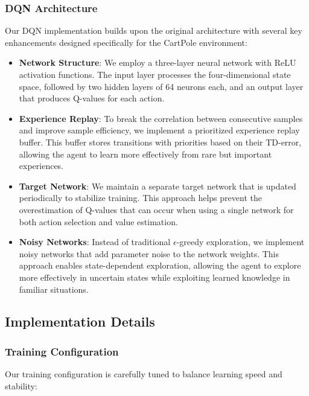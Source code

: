 \documentclass[conference]{IEEEtran}
\begin{document}
\subsubsection{DQN Architecture}
Our DQN implementation builds upon the original architecture with several key enhancements designed specifically for the CartPole environment:

\begin{itemize}
    \item \textbf{Network Structure}: We employ a three-layer neural network with ReLU activation functions. The input layer processes the four-dimensional state space, followed by two hidden layers of 64 neurons each, and an output layer that produces Q-values for each action.
    
    \item \textbf{Experience Replay}: To break the correlation between consecutive samples and improve sample efficiency, we implement a prioritized experience replay buffer. This buffer stores transitions with priorities based on their TD-error, allowing the agent to learn more effectively from rare but important experiences.
    
    \item \textbf{Target Network}: We maintain a separate target network that is updated periodically to stabilize training. This approach helps prevent the overestimation of Q-values that can occur when using a single network for both action selection and value estimation.
    
    \item \textbf{Noisy Networks}: Instead of traditional $\epsilon$-greedy exploration, we implement noisy networks that add parameter noise to the network weights. This approach enables state-dependent exploration, allowing the agent to explore more effectively in uncertain states while exploiting learned knowledge in familiar situations.
\end{itemize}

\subsection{Implementation Details}
\subsubsection{Training Configuration}
Our training configuration is carefully tuned to balance learning speed and stability:
\end{document}
